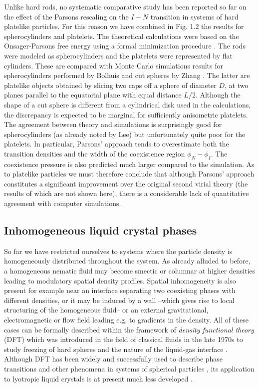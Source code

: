 \documentclass[amssymb]{revtex4}
\begin{document}
Unlike hard rods, no systematic
comparative study has been reported so far on the effect of the Parsons
rescaling on the $I-N$ transition in systems of hard platelike particles.
For this reason  we have combined in  Fig. 1.2 the results for spherocylinders and platelets.
The theoretical calculations were based on the Onsager-Parsons free  energy 
using a formal minimization procedure \cite{herzfeldgrid}.
The rods were modeled as spherocylinders and the platelets were represented
by flat cylinders.
These are compared with Monte Carlo simulations results for spherocylinders
performed by Bolhuis \cite{Bolhuisintracing} and cut spheres by
Zhang \cite{zhang2}. The latter are platelike objects
obtained by slicing two caps off a sphere of diameter $D$, at two planes parallel 
to the equatorial plane with equal distance $L/2$. Although the shape of a cut sphere
is different from a cylindrical disk used in the calculations,
the discrepancy is expected to be marginal for sufficiently anisometric platelets.
The agreement between theory and simulations is surprisingly good for spherocylinders 
(as already noted by Lee) but unfortunately quite poor for the platelets.
In particular, Parsons' approach tends to overestimate both the transition densities 
and the  width of the coexistence region $\phi_{N}-\phi_{I}$. 
The coexistence pressure is also predicted much larger compared to the simulation.
As to  platelike particles we must therefore conclude that although  Parsons' approach constitutes 
a significant improvement over
 the original  second virial theory (the results of which are not shown here), 
there is a considerable lack
of quantitative agreement with computer simulations. 


\subsection{Inhomogeneous liquid crystal phases}

So far we have restricted ourselves to systems where the particle 
density is homogeneously distributed throughout the system.
As already alluded to before, a homogeneous nematic fluid may  
become smectic or columnar  at higher densities leading to 
 modulatory spatial  density profiles.
Spatial inhomogeneity
is also  present for example near an interface separating two  coexisting phases with different
densities,  or it may be induced by a wall  --which gives rise to local structuring of the homogeneous fluid--
or an external gravitational, electromagnetic or flow field
leading e.g. to gradients in the density.
All of these cases can be formally described within 
the framework of {\em density functional theory} (DFT) which was introduced in the field
of classical fluids in the late 1970s to study freezing of hard spheres \cite{ramakrishnan77,ramakrishnan} and the nature of the liquid-gas interface \cite{evansDFT}. Although DFT has been widely and 
successfully used to describe phase transitions and other phenomena in systems of spherical particles
\cite{bauscryst,lowenDFT}, its application
to lyotropic liquid crystals is at present much less developed \cite{Vroege92,DFTspecialJPCM}. 
\end{document}
